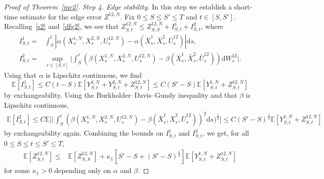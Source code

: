 \documentclass{amsart}
\newcommand{\E}{\mathbb{E}}
\newcommand{\bX}{\bar X}
\newcommand{\bU}{\bar U}
\newcommand{\dd}{{\mathrm{d}}}
\begin{document}
\begin{proof}[Proof of Theorem~\ref{mr2}]
{\it Step 4. Edge stability.}
In this step we establish a short-time estimate for the edge error $Z^{12,N}$.
Fix $0\leq S\leq S'\leq T$ and $t\in[S,S']$. Recalling~\eqref{s2} and~\eqref{dfg2}, we see that
$Z^{12,N}_{S,t} \leq Z^{12,N}_{S,S}+ I^1_{S,t}+I^2_{S,t}$, where
\begin{align*}
I^1_{S,t}=&\int_S^t |\alpha(X^{1,N}_s,X^{2,N}_s,U^{12,N}_s)-
\alpha(\bX^{1}_s,\bX^{2}_s,\bU^{12}_s)| \dd s,\\
I^2_{S,t}=&\sup_{r\in [S,t]} \Big|\int_S^r (\beta(X^{1,N}_s,X^{2,N}_s,U^{12,N}_s)-
\beta(\bX^{1}_s,\bX^{2}_s,\bU^{12}_s))\dd W^{12}_s \Big|.
\end{align*}
Using that $\alpha$ is Lipschitz continuous, we find
$$
\E[I^1_{S,t}]\leq C(t-S) \E[Y^{1,N}_{S,t}+ Y^{2,N}_{S,t}+Z^{12,N}_{S,t}] \leq C(S'-S)\E[Y^{1,N}_{S,t}+Z^{12,N}_{S,t}]
$$
by exchangeability. Using the Burkholder--Davis--Gundy inequality and that $\beta$ is Lipschitz continuous,
\begin{align*}
\E[I^2_{S,t}]\leq C \E\Big[\Big(\int_S^t (\beta(X^{1,N}_s,X^{2,N}_s,U^{12,N}_s)-
\beta(\bX^{1}_s,\bX^{2}_s,\bU^{12}_s))^2 \dd s \Big)^{\frac 12}\Big]
\leq  C (S'-S)^{\frac12}\E[Y^{1,N}_{S,t}+Z^{12,N}_{S,t}]
\end{align*}
by exchangeability again. Combining the bounds on $I^1_{S,t}$ and $I^2_{S,t}$, we get,
for all $0\leq S \leq t \leq S' \leq T$,
\begin{align*}
\E[Z^{12,N}_{S,t}] \leq & \E[Z^{12,N}_{S,S}]
+ \kappa_{1} [S'-S+(S'-S)^{\frac12}]\E[Y^{1,N}_{S,t}+Z^{12,N}_{S,t}]
\end{align*}
for some $\kappa_{1}>0$ depending only on $\alpha$ and $\beta$.


\end{proof}
\end{document}
